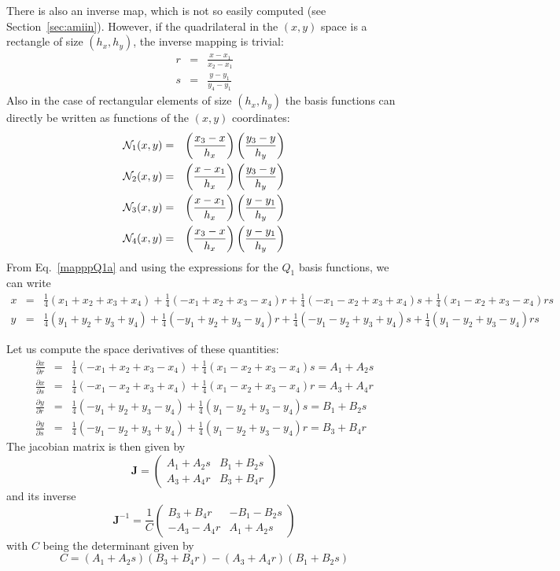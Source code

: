 There is also an inverse map, which is not so easily computed (see Section~\ref{sec:amiin}).
However, if the quadrilateral in the $(x,y)$ space is a rectangle of size $(h_x,h_y)$, 
the inverse mapping is trivial:
\begin{eqnarray}
r&=&\frac{x-x_1}{x_2-x_1} \\
s&=&\frac{y-y_1}{y_4-y_1} 
\end{eqnarray}
Also in the case of rectangular elements of size $(h_x,h_y)$
the basis functions can directly be written as functions of the $(x,y)$ coordinates:
\begin{eqnarray}
{\mathcal{N}}_1(x,y) &=& \left( \frac{x_3 -x }{h_x}  \right) \left( \frac{y_3 -y }{h_y}  \right) \nonumber\\
{\mathcal{N}}_2(x,y) &=& \left( \frac{x - x_1}{h_x}  \right) \left( \frac{y_3 -y }{h_y}  \right) \nonumber\\
{\mathcal{N}}_3(x,y) &=& \left( \frac{x - x_1}{h_x}  \right) \left( \frac{y - y_1}{h_y}  \right) \nonumber\\
{\mathcal{N}}_4(x,y) &=& \left( \frac{x_3 -x }{h_x}  \right) \left( \frac{y - y_1}{h_y}  \right) \nonumber 
\end{eqnarray}
From Eq.~\eqref{mapppQ1a} and using the expressions for the $Q_1$ basis functions, we can write 
\begin{eqnarray}
x &=& 
 \frac14(x_1+ x_2+ x_3 +x_4) 
+\frac14(-x_1 +x_2 +x_3 -x_4) r 
+\frac14(-x_1 -x_2 +x_3 +x_4) s
+\frac14(x_1 -x_2 +x_3 -x_4) rs \nonumber\\
y &=& 
 \frac14(y_1+ y_2+ y_3 +y_4) 
+\frac14(-y_1 +y_2 +y_3 -y_4) r 
+\frac14(-y_1 -y_2 +y_3 +y_4) s
+\frac14(y_1 -y_2 +y_3 -y_4) rs \nonumber
\end{eqnarray}

Let us compute the space derivatives of these quantities:
\begin{eqnarray}
\frac{\partial x}{\partial r} &=& \frac14(-x_1 +x_2 +x_3 -x_4) +\frac14(x_1 -x_2 +x_3 -x_4) s = A_1 + A_2s\nonumber\\
\frac{\partial x}{\partial s} &=& \frac14(-x_1 -x_2 +x_3 +x_4) +\frac14(x_1 -x_2 +x_3 -x_4) r = A_3 + A_4r\nonumber\\
\frac{\partial y}{\partial r} &=& \frac14(-y_1 +y_2 +y_3 -y_4) +\frac14(y_1 -y_2 +y_3 -y_4) s = B_1 + B_2s\nonumber\\
\frac{\partial y}{\partial s} &=& \frac14(-y_1 -y_2 +y_3 +y_4) +\frac14(y_1 -y_2 +y_3 -y_4) r = B_3 + B_4r \nonumber
\end{eqnarray}
The jacobian matrix is then given by
\[
{\bm J} = \left(
\begin{array}{cc}
A_1 + A_2s & B_1 + B_2s \\
A_3 + A_4r & B_3 + B_4r
\end{array}
\right)
\]
and its inverse
\[
{\bm J}^{-1} = \frac{1}{C}
\left(
\begin{array}{cc}
B_3 + B_4r & -B_1 - B_2s \\
-A_3 - A_4r & A_1 + A_2s
\end{array}
\right)
\]
with $C$ being the determinant given by
\[
C= (A_1 + A_2s)(B_3 + B_4r)-(A_3 + A_4r)(B_1 + B_2s)
\]



